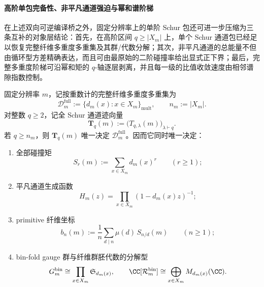 \paragraph{高阶单包完备性、非平凡通道强迫与幂和谱阶梯}
在上述双向可逆编译桥之外，固定分辨率上的单阶 Schur 包还可进一步压缩为三条互补的对象层结论：首先，在高阶区间 \(q\ge |X_m|\) 上，单个 Schur 通道包已经足以恢复完整纤维多重度多重集及其群/代数分解；其次，非平凡通道的总能量不但由循环型方差精确表达，而且可由最原始的二阶碰撞率给出显式正下界；最后，完整多重度阶梯可沿幂和矩的 \(q\)-轴逐层剥离，并且每一级的比值收敛速度由相邻谱隙指数控制。

\begin{theorem}[单个固定阶 Schur 包在 \texorpdfstring{$q\ge |X_m|$}{q>=|X_m|} 时决定完整纤维多重集与对象层分解]\label{thm:pom-highorder-schur-package-determines-full-fiber-multiset}
固定分辨率 \(m\)，记按重数计的完整纤维多重度多重集为
\[
\mathcal D_m^{\mathrm{full}}
:=
\bigl\{d_m(x):x\in X_m\bigr\}_{\mathrm{mult}},
\qquad
n_m:=|X_m|.
\]
对整数 \(q\ge 2\)，记全 Schur 通道迹向量
\[
\mathbf T_q(m):=\bigl(T_{q,\lambda}(m)\bigr)_{\lambda\vdash q}.
\]
若 \(q\ge n_m\)，则 \(\mathbf T_q(m)\) 唯一决定 \(\mathcal D_m^{\mathrm{full}}\)。因而它同时唯一决定：
\begin{enumerate}
  \item 全部碰撞矩
  \[
  S_r(m):=\sum_{x\in X_m}d_m(x)^r\qquad(r\ge 1);
  \]
  \item 平凡通道生成函数
  \[
  H_m(z)=\prod_{x\in X_m}(1-d_m(x)z)^{-1};
  \]
  \item primitive 纤维坐标
  \[
  b_n(m):=\frac{1}{n}\sum_{d\mid n}\mu(d)\,S_{n/d}(m)\qquad(n\ge 1);
  \]
  \item bin-fold gauge 群与纤维群胚代数的分解型
  \[
  G_m^{\mathrm{bin}}\cong\prod_{x\in X_m}\mathfrak S_{d_m(x)},
  \qquad
  \CC[\mathcal R_m^{\mathrm{bin}}]\cong\bigoplus_{x\in X_m}M_{d_m(x)}(\CC).
  \]
\end{enumerate}
\end{theorem}
